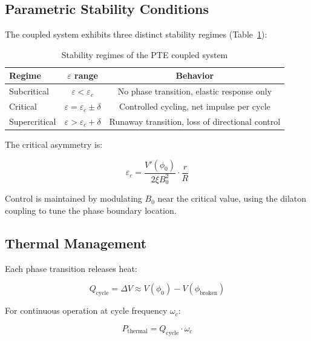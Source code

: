 \documentclass[12pt,a4paper]{article}
\begin{document}
\subsection{Parametric Stability Conditions}

The coupled system exhibits three distinct stability regimes (Table~\ref{tab:stability}):

\begin{table}[H]
    \centering
    \caption{Stability regimes of the PTE coupled system}
    \label{tab:stability}
    \begin{tabular}{lcc}
        \toprule
        \textbf{Regime} & $\varepsilon$ \textbf{range} & \textbf{Behavior} \\
        \midrule
        Subcritical & $\varepsilon < \varepsilon_c$ & No phase transition, elastic response only \\
        Critical & $\varepsilon = \varepsilon_c \pm \delta$ & Controlled cycling, net impulse per cycle \\
        Supercritical & $\varepsilon > \varepsilon_c + \delta$ & Runaway transition, loss of directional control \\
        \bottomrule
    \end{tabular}
\end{table}

The critical asymmetry is:

\begin{equation}
\varepsilon_c = \frac{V'(\phi_0)}{2\xi B_0^2} \cdot \frac{r}{R}
\label{eq:criteps}
\end{equation}

Control is maintained by modulating $B_0$ near the critical value, using the dilaton coupling to tune the phase boundary location.

\subsection{Thermal Management}

Each phase transition releases heat:

\begin{equation}
Q_{\text{cycle}} = \Delta V \approx V(\phi_0) - V(\phi_{\text{broken}})
\label{eq:heat}
\end{equation}

For continuous operation at cycle frequency $\omega_c$:

\begin{equation}
P_{\text{thermal}} = Q_{\text{cycle}} \cdot \omega_c
\label{eq:thermal}
\end{equation}
\end{document}
